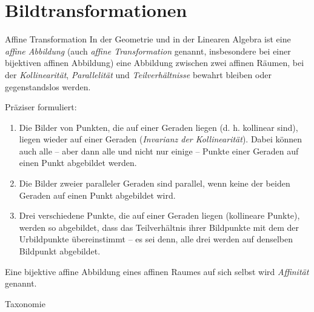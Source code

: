 \section{Bildtransformationen}

\begin{defi}{Affine Transformation}
    In der Geometrie und in der Linearen Algebra ist eine \emph{affine Abbildung} (auch \emph{affine Transformation} genannt, insbesondere bei einer bijektiven affinen Abbildung) eine Abbildung zwischen zwei affinen Räumen, bei der \emph{Kollinearität}, \emph{Parallelität} und \emph{Teilverhältnisse} bewahrt bleiben oder gegenstandslos werden.

    Präziser formuliert:
    \begin{enumerate}
        \item Die Bilder von Punkten, die auf einer Geraden liegen (d. h. kollinear sind), liegen wieder auf einer Geraden (\emph{Invarianz der Kollinearität}). Dabei können auch alle -- aber dann alle und nicht nur einige -- Punkte einer Geraden auf einen Punkt abgebildet werden.
        \item Die Bilder zweier paralleler Geraden sind parallel, wenn keine der beiden Geraden auf einen Punkt abgebildet wird.
        \item Drei verschiedene Punkte, die auf einer Geraden liegen (kollineare Punkte), werden so abgebildet, dass das Teilverhältnis ihrer Bildpunkte mit dem der Urbildpunkte übereinstimmt -- es sei denn, alle drei werden auf denselben Bildpunkt abgebildet.
    \end{enumerate}

    Eine bijektive affine Abbildung eines affinen Raumes auf sich selbst wird \emph{Affinität} genannt.
\end{defi}

\begin{bonus}{Taxonomie}

\end{bonus}


